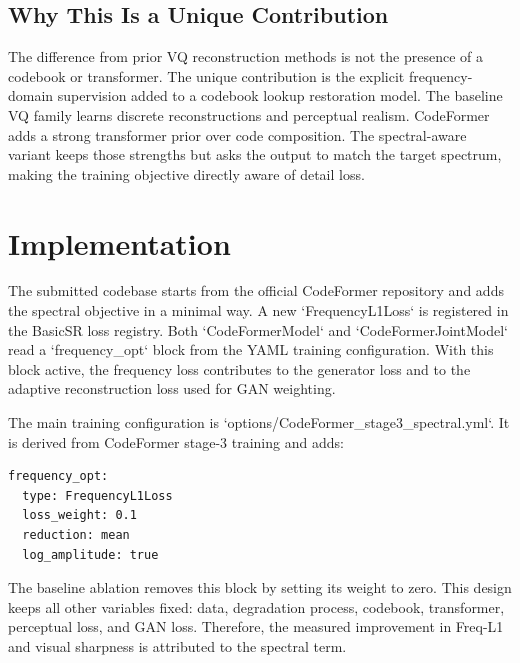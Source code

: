 \documentclass[10pt,twocolumn,letterpaper]{article}
\begin{document}
\subsection{Why This Is a Unique Contribution}
The difference from prior VQ reconstruction methods is not the presence of a codebook or transformer. The unique contribution is the explicit frequency-domain supervision added to a codebook lookup restoration model. The baseline VQ family learns discrete reconstructions and perceptual realism. CodeFormer adds a strong transformer prior over code composition. The spectral-aware variant keeps those strengths but asks the output to match the target spectrum, making the training objective directly aware of detail loss.

\section{Implementation}
The submitted codebase starts from the official CodeFormer repository and adds the spectral objective in a minimal way. A new `FrequencyL1Loss` is registered in the BasicSR loss registry. Both `CodeFormerModel` and `CodeFormerJointModel` read a `frequency\_opt` block from the YAML training configuration. With this block active, the frequency loss contributes to the generator loss and to the adaptive reconstruction loss used for GAN weighting.

The main training configuration is `options/CodeFormer\_stage3\_spectral.yml`. It is derived from CodeFormer stage-3 training and adds:
\begin{verbatim}
frequency_opt:
  type: FrequencyL1Loss
  loss_weight: 0.1
  reduction: mean
  log_amplitude: true
\end{verbatim}
The baseline ablation removes this block by setting its weight to zero. This design keeps all other variables fixed: data, degradation process, codebook, transformer, perceptual loss, and GAN loss. Therefore, the measured improvement in Freq-L1 and visual sharpness is attributed to the spectral term.
\end{document}
